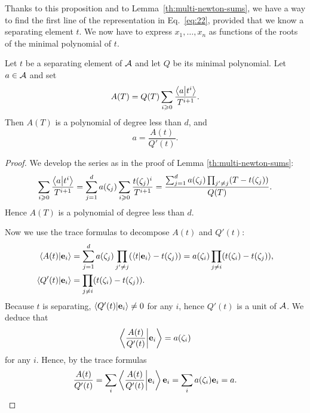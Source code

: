 Thanks to this proposition and to Lemma~\ref{th:multi-newton-sums}, we
have a way to find the first line of the representation in
Eq.~\eqref{eq:22}, provided that we know a separating element $t$. We
now have to express $x_1,\ldots,x_n$ as functions of the roots of the
minimal polynomial of $t$.

\begin{theorem}
  \label{th:rur}
  Let $t$ be a separating element of $\mathcal{A}$ and let $Q$ be its
  minimal polynomial. Let $a\in\mathcal{A}$ and set
  \begin{equation}
    \label{eq:38}
    A(T) = Q(T)\sum_{i\geqslant0}\frac{\left\langle a \middle| t^i \right\rangle}{T^{i+1}}
    \text{.}
  \end{equation}
  Then $A(T)$ is a polynomial of degree less than $d$, and
  \begin{equation}
    \label{eq:39}
    a = \frac{A(t)}{Q'(t)}
    \text{.}
  \end{equation}
\end{theorem}
\begin{proof}
  We develop the series as in the proof of Lemma
  \ref{th:multi-newton-sums}:
  \begin{equation}
    \label{eq:40}
    \sum_{i\geqslant0}\frac{\left\langle a \middle| t^i \right\rangle}{T^{i+1}} =
    \sum_{j=1}^da(\zeta_j)\sum_{i\geqslant0}\frac{t(\zeta_j)^i}{T^{i+1}}=
    \frac{\sum_{j=1}^da(\zeta_j)\prod_{j'\ne j}(T-t(\zeta_j))}{Q(T)}
    \text{.}
  \end{equation}
  Hence $A(T)$ is a polynomial of degree less than $d$.

  Now we use the trace formulas to decompose 
  $A(t)$ and $Q'(t)$:
  \begin{align}
    \label{eq:41}
    \left\langle A(t) \middle| \mathbf{e}_i \right\rangle &=
    \sum_{j=1}^d a(\zeta_j)\prod_{j'\ne j}(\left\langle t \middle| \mathbf{e}_i \right\rangle-t(\zeta_j)) =
    a(\zeta_i)\prod_{j\ne i}(t(\zeta_i)-t(\zeta_j))
    \text{,}\\
    \left\langle Q'(t) \middle| \mathbf{e}_i \right\rangle &=
    \prod_{j\ne i}(t(\zeta_i)-t(\zeta_j))
    \text{.}
  \end{align}
  Because $t$ is separating, $\left\langle Q'(t) \middle| \mathbf{e}_i \right\rangle\ne0$ for any
  $i$, hence $Q'(t)$ is a unit of $\mathcal{A}$. We deduce that
  \begin{equation}
    \label{eq:42}
    \left\langle \frac{A(t)}{Q'(t)} \middle| \mathbf{e}_i \right\rangle = a(\zeta_i)
  \end{equation}
  for any $i$. Hence, by the trace formulas
  \begin{equation}
    \label{eq:43}
    \frac{A(t)}{Q'(t)} = \sum_i\left\langle \frac{A(t)}{Q'(t)} \middle| \mathbf{e}_i \right\rangle\mathbf{e}_i =
    \sum_i a(\zeta_i)\mathbf{e}_i = a
    \text{.}
  \end{equation}
\end{proof}

